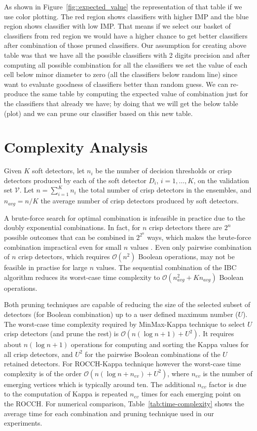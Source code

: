 As shown in Figure~\ref{fig::expected_value}  the representation of that table if we use color plotting. The red region shows classifiers with higher IMP and the blue region shows classifier with low IMP. That means if we select our basket of classifiers from red region we would have a higher chance to get better classifiers after combination of those pruned classifiers. Our assumption for creating above table was that we have all the possible classifiers with 2 digits precision and after computing all possible combination for all the classifiers we set the value of each cell below minor diameter to zero (all the classifiers below random line) since want to evaluate goodness of classifiers better than random guess.
We can re-produce the same table by computing the expected value of combination just for the classifiers that already we have; by doing that we will get the below table (plot) and we can prune our classifier based on this new table.

\section{Complexity Analysis}
\label{sub:complexity}

Given $K$ soft detectors, let $n_i$ be the number of decision thresholds or crisp detectors produced by each of the soft detector $D_i$, $i=1,\ldots, K$, on the validation set $\mathcal{V}$.
Let $n=\sum_{i=1}^{K} n_i$ the total number of crisp detectors in the ensembles, and $n_{avg} = n/K$ the average number of crisp detectors produced by soft detectors.

A brute-force search for optimal combination is infeasible in practice due to the doubly exponential combinations.
In fact, for $n$ crisp detectors there are $2^n$ possible outcomes that can be combined in $2^{2^n}$ ways, which makes the brute-force combination impractical even for small $n$ values \cite{Barreno2008}.
Even only pairwise combination of $n$ crisp detectors, which requires $\mathcal{O}(n^2)$ Boolean operations, may not be feasible in practise for large $n$ values.
The sequential combination of the IBC algorithm reduces its worst-case time complexity to $\mathcal{O}(n_{avg}^2 + Kn_{avg})$ Boolean operations.

Both pruning techniques are capable of reducing the size of the selected subset of detectors (for Boolean combination) up to a user defined maximum number ($U$).
The worst-case time complexity required by MinMax-Kappa technique to select $U$ crisp detectors (and prune the rest) is $\mathcal{O}(n(\log n + 1) + U^2)$.
It requires about $n(\log n + 1)$ operations for computing and sorting the Kappa values for all crisp detectors, and $U^2$ for the pairwise Boolean combinations of the $U$ retained detectors.
For ROCCH-Kappa technique however the worst-case time complexity is of the order $\mathcal{O}(n(\log n +n_{ev}) + U^2)$, where $n_{ev}$ is the number of emerging vertices which is typically around ten.
The additional $n_{ev}$ factor is due to the computation of Kappa is repeated $n_{ev}$ times for each emerging point on the ROCCH.
For numerical comparison, Table~\ref{tab:time-complexity} shows the average time for each combination and pruning technique used in our experiments.

